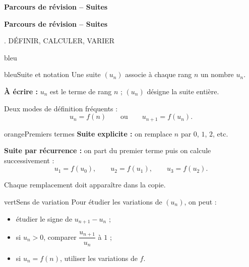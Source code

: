 \documentclass[11pt,a4paper]{article}
\newcommand{\Un}{\ensuremath{(u_n)}}
\newcommand{\tagcol}[2]{\begin{tcolorbox}[enhanced,colback=#1!11,colframe=#1!45!black,boxrule=0.42pt,arc=2mm,left=1mm,right=1mm,top=0.45mm,bottom=0.45mm,before skip=0mm,after skip=0.85mm,fontupper=\bfseries\scriptsize,colupper=#1!55!black]\centering #2\end{tcolorbox}}
\newcommand{\titrepage}{\begin{tcolorbox}[colback=white,colframe=bleu!70!black,boxrule=0.65pt,arc=3mm,left=2.5mm,right=2.5mm,top=1.15mm,bottom=1.15mm,before skip=0mm,after skip=1.4mm,drop fuzzy shadow=black!10]
{\Large\bfseries Parcours de révision -- Suites}\end{tcolorbox}}
\begin{document}
\begin{center}
{\LARGE\bfseries Parcours de révision -- Suites}\\[1mm]

\end{center}
\vspace{2mm}
\tableofcontents
\clearpage

{}
\pagestyle{empty}
\begin{landscape}
\pagecolor{fondpage}\color{encre}
\thispagestyle{empty}

\fontsize{7.85}{8.45}\selectfont

\titrepage

\noindent
\begin{minipage}[t]{0.242\linewidth}
\tagcol{bleu}{1. DÉFINIR, CALCULER, VARIER}
\begin{panel}{bleu}

\begin{fichebox}{bleu}{Suite et notation}
Une suite \Un{} associe à chaque rang $n$ un nombre $u_n$.

\medskip
\textbf{À écrire :} $u_n$ est le terme de rang $n$ ; \Un{} désigne la suite entière.

\medskip
Deux modes de définition fréquents :
\[
 u_n=f(n)
 \qquad\text{ou}\qquad
 u_{n+1}=f(u_n).
\]
\end{fichebox}

\begin{fichebox}{orange}{Premiers termes}
\textbf{Suite explicite :} on remplace $n$ par $0$, $1$, $2$, etc.

\medskip
\textbf{Suite par récurrence :} on part du premier terme puis on calcule successivement :
\[
 u_1=f(u_0),\qquad u_2=f(u_1),\qquad u_3=f(u_2).
\]

\medskip
Chaque remplacement doit apparaître dans la copie.
\end{fichebox}

\begin{fichebox}{vert}{Sens de variation}
Pour étudier les variations de \Un, on peut :
\begin{itemize}
    \item étudier le signe de $u_{n+1}-u_n$ ;
    \item si $u_n>0$, comparer $\dfrac{u_{n+1}}{u_n}$ à $1$ ;
    \item si $u_n=f(n)$, utiliser les variations de $f$.
\end{itemize}


\end{fichebox}
\end{panel}
\end{minipage}
\end{landscape}
\end{document}
